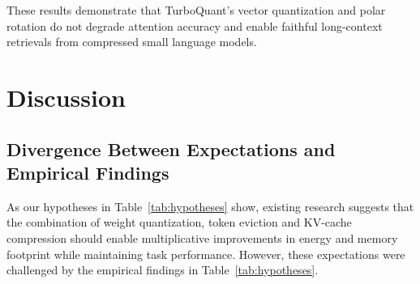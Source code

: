 \documentclass[sigconf,nonacm]{acmart}
\begin{document}
These results demonstrate that TurboQuant's vector quantization and polar rotation do not degrade attention accuracy and enable faithful long-context retrievals from compressed small language models.


\section{Discussion}

\subsection{Divergence Between Expectations and Empirical Findings}

As our hypotheses in Table~\ref{tab:hypotheses} show, existing research suggests that the combination of weight quantization, token eviction and KV-cache compression should enable multiplicative improvements in energy and memory footprint while maintaining task performance. However, these expectations were challenged by the empirical findings in Table~\ref{tab:hypotheses}.



\begin{table}[htbp]
\caption{Initial Expectations versus Empirical Findings}
\label{tab:hypotheses}
\centering\small
{}
\end{table}
\end{document}
